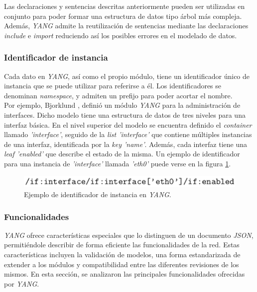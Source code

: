 Las declaraciones y sentencias descritas anteriormente pueden ser utilizadas en conjunto para poder formar una estructura de datos tipo árbol más compleja.
Además, \textit{YANG} admite la reutilización de sentencias mediante las declaraciones \textit{include} e \textit{import} reduciendo así los posibles errores en el modelado de datos.

\subsubsection{Identificador de instancia }
Cada dato en \textit{YANG}, así como el propio módulo, tiene un identificador único de instancia que se puede utilizar para referirse a él. Los identificadores se denominan \textit{namespace}, y admiten un prefijo para poder acortar el nombre. 
\\

Por ejemplo, Bjorklund \parencite{yangsystem}, definió un módulo \textit{YANG} para la administración de interfaces. Dicho modelo tiene una estructura de datos de tres niveles para una interfaz básica. En el nivel superior del modelo se encuentra definido el \textit{container} llamado \textit{'interface'}, seguido de la \textit{list 'interface'} que contiene múltiples instancias de una interfaz, identificada por la \textit{key 'name'}. Además, cada interfaz tiene una \textit{leaf 'enabled'} que describe el estado de la misma. Un ejemplo de identificador para una instancia de \textit{'interface'} llamada \textit{'eth0'} puede verse en la figura \ref{fig:interfaceyang}.

\begin{figure}[htbp]
	\centering
	\includegraphics[scale=0.7]{Figures/interface-yang.pdf}
	\caption{Ejemplo de identificador de instancia en \textit{YANG}.}
	\label{fig:interfaceyang}
  \end{figure}

  \subsubsection{Funcionalidades}
  \textit{YANG} ofrece características especiales que lo distinguen de un documento \textit{JSON}, permitiéndole describir de forma eficiente las funcionalidades de la red. Estas características incluyen la validación de modelos, una forma estandarizada de extender a los módulos y compatibilidad entre las diferentes revisiones de los mismos. En esta sección, se analizaron las principales funcionalidades ofrecidas por \textit{YANG}.

